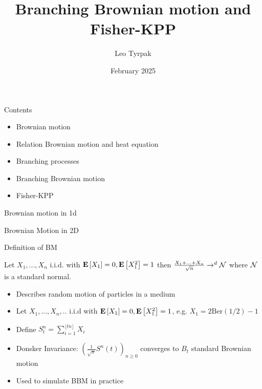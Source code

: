 \documentclass{beamer}
\title{Branching Brownian motion and Fisher-KPP}
\author{Leo Tyrpak}
\institute{Oxford}
\date{February 2025}
\begin{document}
\maketitle

\begin{frame}{Contents}
\begin{itemize}
    \item Brownian motion
    \item Relation Brownian motion and heat equation
    \item Branching processes
    \item Branching Brownian motion
    \item Fisher-KPP
\end{itemize}
    
\end{frame}



\begin{frame}{Brownian motion in 1d}
    
\end{frame}


\begin{frame}{Brownian Motion in 2D}
    
\end{frame}



\begin{frame}{Definition of BM}
\begin{thm}[CLT]
    Let $X_1,...,X_n$ i.i.d. with ${\mathbf E}\left[X_1\right]=0,{\mathbf E}\left[X_1^2\right]=1$ then $\frac{X_1+...+X_n}{\sqrt{n}}\rightarrow^d\mathcal N$ where $\mathcal N$ is a standard normal.
\end{thm}
    \begin{itemize}
        \item Describes random motion of particles in a medium
        \item Let $X_1,...,X_n,..$ i.i.d with ${\mathbf E}\left[X_1\right]=0,{\mathbf E}\left[X_1^2\right]=1$, e.g. $X_1=2\text{Ber}(1/2)-1$
        \item Define $S^n_t=\sum_{i=1}^{\lfloor tn\rfloor}X_i$
        \item Donsker Invariance: $(\frac{1}{\sqrt{n}}S^n(t))_{n\geq0}$ converges to $B_t$ standard Brownian motion
        \item Used to simulate BBM in practice
    \end{itemize}
    
\end{frame}
\end{document}
